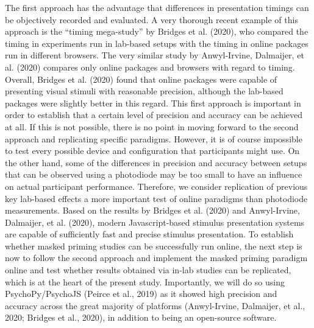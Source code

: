 \documentclass[
  english,
  man,floatsintext]{apa6}
\begin{document}
The first approach has the advantage that differences in presentation timings can be objectively recorded and evaluated. A very thorough recent example of this approach is the ``timing mega-study'' by Bridges et al. (2020), who compared the timing in experiments run in lab-based setups with the timing in online packages run in different browsers. The very similar study by Anwyl-Irvine, Dalmaijer, et al. (2020) compares only online packages and browsers with regard to timing. Overall, Bridges et al. (2020) found that online packages were capable of presenting visual stimuli with reasonable precision, although the lab-based packages were slightly better in this regard. This first approach is important in order to establish that a certain level of precision and accuracy can be achieved at all. If this is not possible, there is no point in moving forward to the second approach and replicating specific paradigms. However, it is of course impossible to test every possible device and configuration that participants might use. On the other hand, some of the differences in precision and accuracy between setups that can be observed using a photodiode may be too small to have an influence on actual participant performance. Therefore, we consider replication of previous key lab-based effects a more important test of online paradigms than photodiode measurements. Based on the results by Bridges et al. (2020) and Anwyl-Irvine, Dalmaijer, et al. (2020), modern Javascript-based stimulus presentation systems are capable of sufficiently fast and precise stimulus presentation. To establish whether masked priming studies can be successfully run online, the next step is now to follow the second approach and implement the masked priming paradigm online and test whether results obtained via in-lab studies can be replicated, which is at the heart of the present study. Importantly, we will do so using PsychoPy/PsychoJS (Peirce et al., 2019) as it showed high precision and accuracy across the great majority of platforms (Anwyl-Irvine, Dalmaijer, et al., 2020; Bridges et al., 2020), in addition to being an open-source software.
\end{document}

